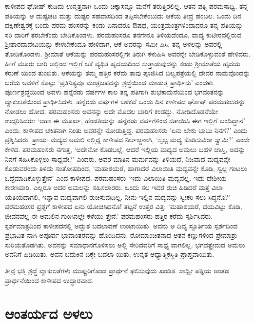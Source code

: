 ಕಾಳೀಪದ ಘೋಷ್ ಕುಡಿದು ಉನ್ಮತ್ತನಾಗಿ ಒಂದು ಚಿಕ್ಕಾಸನ್ನೂ ಮನೆಗೆ ತರುತ್ತಿರಲಿಲ್ಲ. ಆತನ ಪತ್ನಿ ಪರಮಸಾಧ್ವಿ. ತನ್ನ ಪತಿಯನ್ನು ಆ ದುಷ್ಟಚಟ ಮತ್ತು ದುಷ್ಟರ ಸಹವಾಸದಿಂದ ತಪ್ಪಿಸಬೇಕೆಂಬುದು ಆಕೆಯ ತೀವ್ರ ಹಂಬಲ. ಒಂದು ದಿನ ದಕ್ಷಿಣೇಶ್ವರಕ್ಕೆ ಬಂದು ಪರಮ ಹಂಸರನ್ನು ಕಂಡು ಏನಾದರೂ ಔಷಧ, ಯಂತ್ರಮಂತ್ರಗಳಿಂದಾದರೂ ತನ್ನ ಪತಿಯನ್ನು ಸರಿ ದಾರಿಗೆ ತರಬೇಕೆಂದು ಬೇಡಿಕೊಂಡಳು. ಪರಮಹಂಸರೂ ತನಗೇನೂ ತಿಳಿಯದೆಂದೂ, ವಾದ್ಯ ಕುಟೀರದಲ್ಲಿರುವ ಶ‍್ರೀಶಾರದಾದೇವಿಯನ್ನು ಕೇಳಬೇಕೆಂದೂ ಹೇಳಿದಾಗ, ಆಕೆ ಅವರನ್ನು ಸಮೀ ಪಿಸಿ, ತನ್ನ ಅಳಲನ್ನು ಅವರಲ್ಲಿ ತೋಡಿಕೊಂಡಳು. ಶ‍್ರೀಮಾತೆ ಆಕೆಯನ್ನು ಪರಮಹಂಸರಲ್ಲಿಗೇ ತಿರುಗಿ ಕಳುಹಿಸಿ ಅವರನ್ನೇ ಬೇಡಿಕೊಳ್ಳುವಂತೆ ಹೇಳಿದರು. ಹೀಗೆ ಮೂರು ಬಾರಿ ಅಲ್ಲಿಂದ ಇಲ್ಲಿಗೆ ಆಕೆ ವ್ಯಥಿತ ಹೃದಯದಿಂದ ಸುತ್ತಾಡುವುದನ್ನು ಕಂಡು ಶ‍್ರೀಮಾತೆಯ ಹೃದಯ ಕರುಣೆ ಯಿಂದ ತುಂಬಿತು. ಆಕೆಯನ್ನು ತಮ್ಮ ಹತ್ತಿರ ಕರೆದು ತಾವು ಪೂಜಿಸಿದ ಬಿಲ್ವಪತ್ರೆಯಲ್ಲಿ ದೇವರ ನಾಮವೊಂದನ್ನು ಬರೆದು ಅವಳಿಗೆ ಕೊಟ್ಟು ‘ಪ್ರತಿನಿತ್ಯವೂ ಮಂತ್ರಜಪವನ್ನು ಶ್ರದ್ಧೆಯಿಂದ ಮಾಡುತ್ತ ಪ್ರಾರ್ಥಿಸು’ ಎಂದಳು. ಪೂರ್ಣಶ್ರದ್ಧೆಯಿಂದ ಅವಳು ಹನ್ನೆರಡು ವರ್ಷಗಳ ಕಾಲ ತನ್ನ ಪತಿಗಾಗಿ ಶುಭಕಾಮನೆಯಿಂದ ಭಗವಂತನನ್ನು ವ್ಯಾಕುಲತೆಯಿಂದ ಪ್ರಾರ್ಥಿಸಿದಳು. ಹನ್ನೆರಡು ವರ್ಷಗಳ ಬಳಿಕವೆ ಒಂದು ದಿನ ಕಾಳೀಪದ ಘೋಷ್ ಪರಮಹಂಸರನ್ನು ನೋಡಲು ಹೋದ. ಪರಮಹಂಸರು ಅವನನ್ನು ಅದೇ ಮೊದಲ ಬಾರಿಗೆ ಕಂಡದ್ದು. ನೋಡಿದೊಡನೆಯೇ ಉದ್ಗರಿಸಿದರು: ‘ಆಹಾ ಈ ಮೂರ್ಖ, ಹೆಂಡತಿಯನ್ನು ಹನ್ನೆರಡು ವರ್ಷಗಳಿಂದ ಸತಾಯಿಸಿ ಈಗ ಇಲ್ಲಿಗೆ ಬಂದಿದ್ದಾನೆ’ ಎಂದು. ಕಾಳೀಪದ ಚಕಿತನಾಗಿ ನಿಂತು ಅವರನ್ನೇ ನೋಡುತ್ತಿದ್ದ. ಪರಮಹಂಸರು ‘ಏನು ಬೇಕು ಬಾಬು ನಿನಗೆ?’ ಎಂದು ಪ್ರಶ್ನಿಸಿದರು. ಪ್ರಾಯಃ ಮದ್ಯದ ಅಮಲಿ ನಲ್ಲಿದ್ದ ಕಾಳೀಪದ ನಿರ್ಲಜ್ಜನಾಗಿ, ‘ಸ್ವಲ್ಪ ಮದ್ಯ ಕೊಡಿಸುವಿರಾ ಸ್ವಾಮಿ?’ ಎಂದೇ ಕೇಳಿದ. ಪರಮಹಂಸರು ನಗುತ್ತ, ‘ಅದೇನೋ ಕೊಡಬಲ್ಲೆ, ಆದರೆ ಇಲ್ಲಿಯ ಮದ್ಯದ ಅಮಲು ಬಹಳ ಜಾಸ್ತಿ, ಅದನ್ನು ನಿನಗೆ ಸಹಿಸಿಕೊಳ್ಳಲು ಸಾಧ್ಯವೇ?’ ಎಂದರು. ಅವರ ಮಾತಿನ ಮರ್ಮವನ್ನು ತಿಳಿಯದೆ, ನಿಜವಾದ ಮದ್ಯವನ್ನೇ ಕೊಡುವರೆಂದು ತಿಳಿದು ಸಂತೋಷದಿಂದ, ‘ಮಹಾಶಯರೆ, ಹಾಗಾದರೆ ವಿಲಾಯಿತಿ ಮದ್ಯವನ್ನೇ ಕೊಡಿ, ಸ್ವಲ್ಪ ಗಂಟಲು ಒದ್ದೆಮಾಡಿಕೊಳ್ಳುತ್ತೇನೆ’ ಎಂದ ಕಾಳೀಪದ. ಪರಮಹಂಸರು ‘ಇದು ವಿಲಾಯಿತಿ ಮದ್ಯವಲ್ಲ. ಇದು ದೇಶೀಯ ಕಾರಣವಾರಿ. ಎಲ್ಲರೂ ಅದರ ಅಮಲನ್ನು ಸಹಿಸಲಾರರು. ಒಂದು ಸಲ ಇದರ ರುಚಿ ಹಿಡಿದರೆ ಮತ್ತೆ ವಿಲಾ ಯತಿಯದಾಗಲಿ, ಇನ್ನಾವ ಮದ್ಯವಾಗಲಿ ರುಚಿಸುವುದಿಲ್ಲ. ನೀನು ಇಲ್ಲಿನ ಮದ್ಯವನ್ನು ಸ್ವೀಕರಿ ಸಲು ಸಿದ್ಧನೊ?’ ಪರಮಹಂಸರ ಪ್ರಶ್ನೆಗೆ ಕಾಳೀಪದ ಏನು ಯೋಚಿಸಿದನೊ! ತಟ್ಟನೆ ಉತ್ತರ ವಿತ್ತ: ‘ಮಹಾಶಯರೆ, ದಯವಿಟ್ಟು ಕೊಡಿ, ಜೀವನವೆಲ್ಲ ಈ ಅಮಲಿನ ಗುಂಗಿನಲ್ಲೇ ಕಳೆಯು ತ್ತೇನೆ.’ ಪರಮಹಂಸರು ಹತ್ತಿರ ಕರೆದು ಸ್ಪರ್ಶಿಸಿದರು. ಸ್ಪರ್ಶಮಾತ್ರದಿಂದ ಕಾಳೀಪದನಲ್ಲಿ ಅದ್ಭುತ ಬದಲಾವಣೆ ಉಂಟಾಯಿತು. ಅವನು ಆ ದಿವ್ಯ ಸ್ಫೂರ್ತಿಯ ಸ್ಪರ್ಶದಿಂದ ಪ್ರಭಾವಿತ ನಾಗಿ ಅಪೂರ್ವ ಭಾವಾಂತರವನ್ನು ಹೊಂದಿದನು. ರೋಮಾಂಚಿತನಾದ ಆತನ ಕಣ್ಣುಗಳಿಂದ ಪ್ರೇಮಾಶ್ರು ಸುರಿಯತೊಡಗಿತು. ಅವನನ್ನು ಸಮಾಧಾನಗೊಳಿಸಲು ಅಲ್ಲಿ ಸೇರಿದವರಿಗೆ ಸಾಧ್ಯ ವಾಗಲಿಲ್ಲ. ಭಗವತ್ಪ್ರೇಮದ ಅಮಲು ಅವನಿಗೆ ಹಿಡಿಯಿತು. ಅವನ ಬದುಕಿನ ದಿಕ್ಕೇ ಬದಲಾ ಯಿತು; ಉನ್ನತ ಆಧ್ಯಾತ್ಮಿಕಸ್ಥಿತಿ ಪ್ರಾಪ್ತವಾಯಿತು.

ತೀವ್ರ ಭಕ್ತಿ ಶ್ರದ್ಧೆ ವ್ಯಾಕುಲತೆಗಳು ಮುಪ್ಪುರಿಗೊಂಡ ಪ್ರಾರ್ಥನೆ ಫಲಿಸುವುದು ಖಂಡಿತ. ಸಾಧ್ವೀ ಪತ್ನಿಯ ಅಂತಹ ಪ್ರಾರ್ಥನೆಯಿಂದ ಕಾಳೀಪದ ಉದ್ಧಾರವಾದ.


\section{ಆಂತರ್ಯದ ಅಳಲು}

